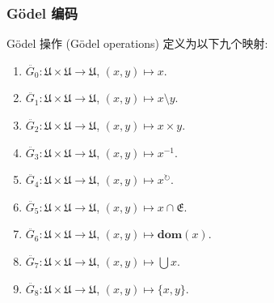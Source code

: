\subsubsection{Gödel 编码}

\begin{definition}
    Gödel 操作 (Gödel operations) 定义为以下九个映射:
    \begin{enumerate}
        \item \(\ddot{G_0} : \mathfrak{U} \times \mathfrak{U} \to \mathfrak{U}\), \((x,y) \mapsto x\).
        \item \(\ddot{G_1} : \mathfrak{U} \times \mathfrak{U} \to \mathfrak{U}\), \((x,y) \mapsto x \setminus y\).
        \item \(\ddot{G_2} : \mathfrak{U} \times \mathfrak{U} \to \mathfrak{U}\), \((x,y) \mapsto x \times y\).
        \item \(\ddot{G_3} : \mathfrak{U} \times \mathfrak{U} \to \mathfrak{U}\), \((x,y) \mapsto x^{-1}\).
        \item \(\ddot{G_4} : \mathfrak{U} \times \mathfrak{U} \to \mathfrak{U}\), \((x,y) \mapsto x^{\circlearrowright}\).
        \item \(\ddot{G_5} : \mathfrak{U} \times \mathfrak{U} \to \mathfrak{U}\), \((x,y) \mapsto x \cap \mathfrak{E}\).
        \item \(\ddot{G_6} : \mathfrak{U} \times \mathfrak{U} \to \mathfrak{U}\), \((x,y) \mapsto \mathbf{dom} (x)\).
        \item \(\ddot{G_7} : \mathfrak{U} \times \mathfrak{U} \to \mathfrak{U}\), \((x,y) \mapsto \bigcup x\).
        \item \(\ddot{G_8} : \mathfrak{U} \times \mathfrak{U} \to \mathfrak{U}\), \((x,y) \mapsto \{x,y\}\).
    \end{enumerate}
\end{definition}



